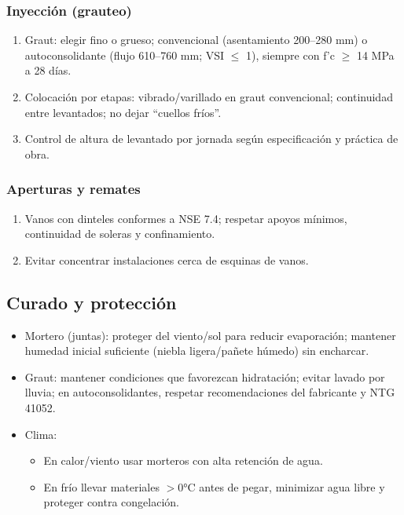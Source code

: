 \documentclass[12pt]{article}
\begin{document}
	\subsubsection{Inyección (grauteo)}
	\begin{enumerate}
		\item Graut: elegir fino o grueso; convencional (asentamiento 200–280 mm) o autoconsolidante (flujo 610–760 mm; VSI $\leq$ 1), siempre con f’c $\geq$ 14 MPa a 28 días.
		\item Colocación por etapas: vibrado/varillado en graut convencional; continuidad entre levantados; no dejar “cuellos fríos”.
		\item Control de altura de levantado por jornada según especificación y práctica de obra.
	\end{enumerate}
	
	\subsubsection{Aperturas y remates}
	\begin{enumerate}
		\item Vanos con dinteles conformes a NSE 7.4; respetar apoyos mínimos, continuidad de soleras y confinamiento.
		\item Evitar concentrar instalaciones cerca de esquinas de vanos.
	\end{enumerate}
	
	\subsection{Curado y protección}
	\begin{itemize}
		\item Mortero (juntas): proteger del viento/sol para reducir evaporación; mantener humedad inicial suficiente (niebla ligera/pañete húmedo) sin encharcar.
		\item Graut: mantener condiciones que favorezcan hidratación; evitar lavado por lluvia; en autoconsolidantes, respetar recomendaciones del fabricante y NTG 41052.
		\item Clima:
		\begin{itemize}
			\item En calor/viento usar morteros con alta retención de agua.
			\item En frío llevar materiales $>$0°C antes de pegar, minimizar agua libre y proteger contra congelación.
		\end{itemize}
	\end{itemize}
	
\end{document}
